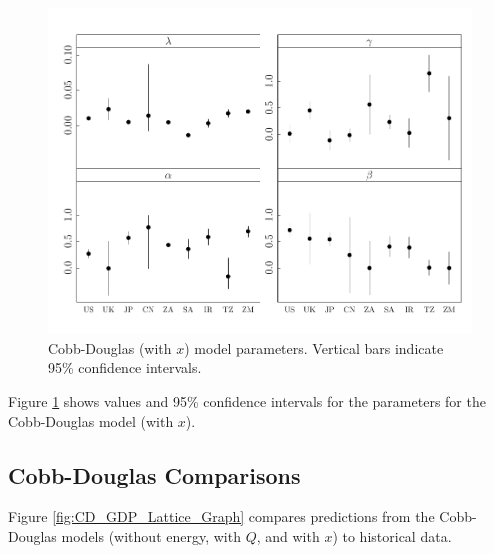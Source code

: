 \documentclass[preprint,authoryear,12pt]{elsarticle}\usepackage{graphicx, color}
\makeatletter
\def\maxwidth{ %
  \ifdim\Gin@nat@width>\linewidth
    \linewidth
  \else
    \Gin@nat@width
  \fi
}
\newenvironment{kframe}{%
 \def\at@end@of@kframe{}%
 \ifinner\ifhmode%
  \def\at@end@of@kframe{\end{minipage}}%
  \begin{minipage}{\columnwidth}%
 \fi\fi%
 \def\FrameCommand##1{\hskip\@totalleftmargin \hskip-\fboxsep
 \colorbox{shadecolor}{##1}\hskip-\fboxsep
     \hskip-\linewidth \hskip-\@totalleftmargin \hskip\columnwidth}%
 \MakeFramed {\advance\hsize-\width
   \@totalleftmargin\z@ \linewidth\hsize
   \@setminipage}}%
 {\par\unskip\endMakeFramed%
 \at@end@of@kframe}
\newenvironment{knitrout}{}{} %
\makeatother
\begin{document}
\begin{knitrout}
\begin{kframe}
{\ttfamily\noindent\color{warningcolor}{Warning: step factor 0.000488281 reduced below 'minFactor' of 0.000976562}}\end{kframe}\begin{figure}[]

\includegraphics[width=\maxwidth]{figure/CDx_Params_Graph} \caption[Cobb-Douglas (with $x$) model parameters]{Cobb-Douglas (with $x$) model parameters. Vertical bars indicate 95\% confidence intervals.\label{fig:CDx_Params_Graph}}
\end{figure}


\end{knitrout}


Figure \ref{fig:CDx_Params_Graph} shows values and 95\% confidence intervals for the parameters for the Cobb-Douglas model (with $x$).


\subsection{Cobb-Douglas Comparisons}

Figure \ref{fig:CD_GDP_Lattice_Graph} compares predictions from the Cobb-Douglas models (without energy, with $Q$, and with $x$) to historical data.
\end{document}
